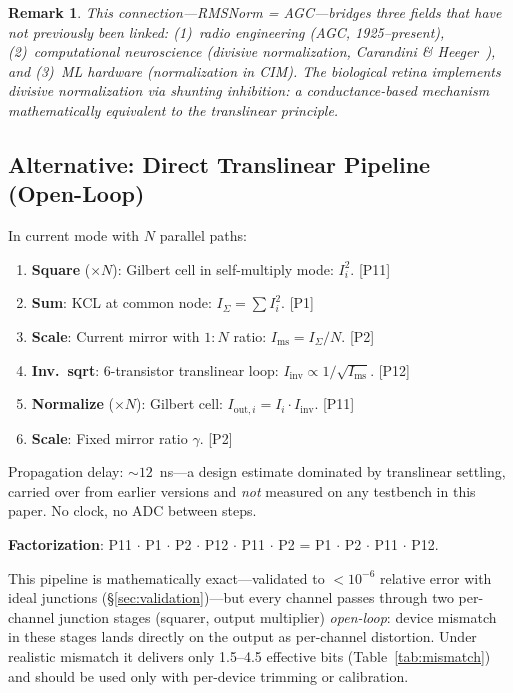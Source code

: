 \documentclass[11pt]{article}
\newtheorem{remark}{Remark}
\begin{document}
\begin{remark}
This connection---RMSNorm = AGC---bridges three fields that have not previously been linked: (1)~radio engineering (AGC, 1925--present), (2)~computational neuroscience (divisive normalization, Carandini \& Heeger~\cite{carandini2012}), and (3)~ML hardware (normalization in CIM). The biological retina implements divisive normalization via shunting inhibition: a conductance-based mechanism mathematically equivalent to the translinear principle.
\end{remark}

\subsection{Alternative: Direct Translinear Pipeline (Open-Loop)}
\label{sec:translinear}

In current mode with $N$ parallel paths:

\begin{enumerate}[leftmargin=*]
\item \textbf{Square} ($\times N$): Gilbert cell in self-multiply mode: $I_i^2$. \hfill [P11]
\item \textbf{Sum}: KCL at common node: $I_{\Sigma} = \sum I_i^2$. \hfill [P1]
\item \textbf{Scale}: Current mirror with $1{:}N$ ratio: $I_{\text{ms}} = I_{\Sigma}/N$. \hfill [P2]
\item \textbf{Inv.\ sqrt}: 6-transistor translinear loop: $I_{\text{inv}} \propto 1/\sqrt{I_{\text{ms}}}$. \hfill [P12]
\item \textbf{Normalize} ($\times N$): Gilbert cell: $I_{\text{out},i} = I_i \cdot I_{\text{inv}}$. \hfill [P11]
\item \textbf{Scale}: Fixed mirror ratio $\gamma$. \hfill [P2]
\end{enumerate}

Propagation delay: ${\sim}12$~ns---a design estimate dominated by translinear settling, carried over from earlier versions and \textit{not} measured on any testbench in this paper. No clock, no ADC between steps.

\textbf{Factorization}: P11 $\cdot$ P1 $\cdot$ P2 $\cdot$ P12 $\cdot$ P11 $\cdot$ P2 = P1 $\cdot$ P2 $\cdot$ P11 $\cdot$ P12.

This pipeline is mathematically exact---validated to $<\!10^{-6}$ relative error with ideal junctions (\S\ref{sec:validation})---but every channel passes through two per-channel junction stages (squarer, output multiplier) \textit{open-loop}: device mismatch in these stages lands directly on the output as per-channel distortion. Under realistic mismatch it delivers only 1.5--4.5 effective bits (Table~\ref{tab:mismatch}) and should be used only with per-device trimming or calibration.
\end{document}
